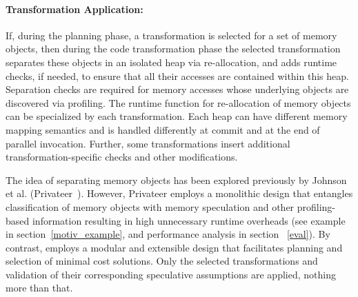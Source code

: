 %
%
%
%
%

\paragraph{Transformation Application:} If, during the planning phase,
a transformation is selected for a set of memory objects, then during
the code transformation phase the selected transformation separates
these objects in an isolated heap via re-allocation, and adds runtime
checks, if needed, to ensure that all their accesses are contained
within this heap.
Separation checks are required for memory accesses whose underlying
objects are discovered via profiling.
The runtime function for re-allocation of memory objects can be
specialized by each transformation.
%
Each heap can have different memory mapping semantics and is handled
differently at commit and at the end of parallel invocation.
%
Further, some transformations insert additional
transformation-specific checks and other modifications.

The idea of separating memory objects has been explored previously by
Johnson et al. (Privateer~\cite{johnson:12:pldi}).  However, Privateer
employs a monolithic design that entangles classification of memory
objects with memory speculation and other
profiling-based information resulting in high unnecessary runtime
overheads (see example in section~\ref{motiv_example}, and performance
analysis in section ~\ref{eval}).
%
By contrast, \name employs a modular and extensible design that
facilitates planning and selection of minimal cost solutions.
%
Only the selected transformations and validation of their
corresponding speculative assumptions are applied, nothing more than
that.


